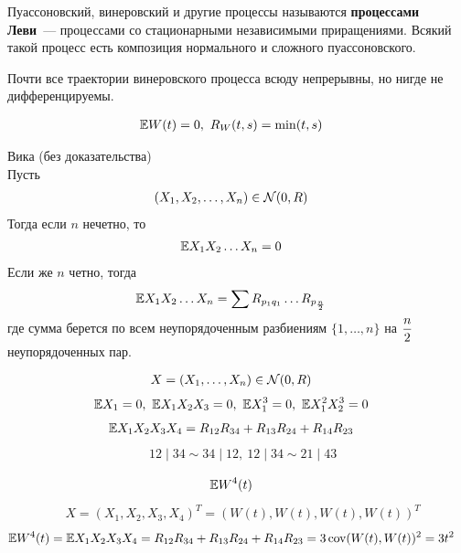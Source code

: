 Пуассоновский, винеровский и другие процессы называются \textbf{процессами
  Леви}~--- процессами со стационарными независимыми приращениями. Всякий такой
процесс есть композиция нормального и сложного пуассоновского.
\begin{Prop}
    Почти все траектории винеровского процесса всюду непрерывны, но нигде не дифференцируемы.
\end{Prop}
\begin{Prop}
    \begin{align*}
      & \mathbb{E} W(t) = 0, \ R_W(t,s) = \min(t,s)
    \end{align*}
\end{Prop}
\begin{theorem} Вика (без доказательства)
    \\
    Пусть
    \begin{align*}
      & (X_1, X_2, \dots, X_n) \in \mathcal{N} (0, R)
    \end{align*}
    Тогда если $n$ нечетно, то
    \begin{align*}
      & \mathbb{E} X_1X_2\dots X_n = 0
    \end{align*}
    Если же $n$ четно, тогда
    \begin{align*}
      & \mathbb{E} X_1X_2\dots X_n = \sum R_{p_1q_1}\dots R_{p_{\frac{n}{2}}}
    \end{align*}
    где сумма берется по всем неупорядоченным разбиениям $\{1, \dots, n\}$ на
    $\displaystyle \frac{n}{2}$ неупорядоченных пар.
\end{theorem}
\begin{example}
    \begin{align*}
      & X = \left( X_1, \dots, X_n \right) \in \mathcal{N}(0, R)
    \end{align*}
    \begin{align*}
      & \mathbb{E} X_1 = 0, \ \mathbb{E} X_1X_2X_3 = 0, \ \mathbb{E} X_1^3 = 0, \ \mathbb{E} X_1^2X_2^3 = 0
    \end{align*}
    \begin{align*}
      & \mathbb{E} X_1X_2X_3X_4 = R_{12}R_{34} +R_{13}R_{24} + R_{14}R_{23}
    \end{align*}
    \begin{align*}
      & 12 \mid 34 \sim 34 \mid 12, \ 12 \mid 34 \sim 21 \mid 43
    \end{align*}
\end{example}
\begin{example}
    \begin{align*}
      & \mathbb{E} W^4(t)
    \end{align*}
    \begin{align*}
      & X = \left( X_1, X_2, X_3, X_4 \right)^T = \left( W(t), W(t), W(t), W(t) \right)^T
    \end{align*}
    \begin{align*}
      & \mathbb{E} W^4(t) = \mathbb{E} X_1X_2X_3X_4 = R_{12}R_{34} +R_{13}R_{24} + R_{14}R_{23} = 3 \operatorname{cov}(W(t),W(t))^2 = 3t^2
    \end{align*}
\end{example}
